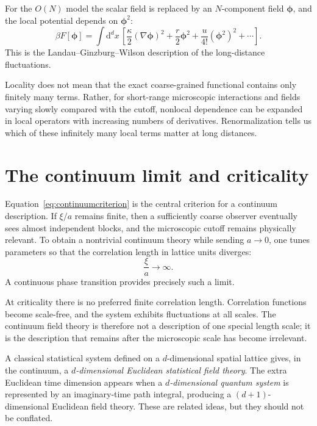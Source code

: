 \documentclass[11pt]{article}
\newcommand{\dd}{\mathrm{d}}
\begin{document}
For the $O(N)$ model the scalar field is replaced by an $N$-component field $\bm\phi$, and the local potential depends on $\bm\phi^2$:
\begin{equation}
  \beta F[\bm\phi]
  =\int \dd^d x\,
  \left[
  \frac{\kappa}{2}(\nabla\bm\phi)^2
  +\frac{r}{2}\bm\phi^2
  +\frac{u}{4!}(\bm\phi^2)^2
  +\cdots
  \right].
  \label{eq:ONLG}
\end{equation}
This is the Landau--Ginzburg--Wilson description of the long-distance fluctuations.

\begin{remarkbox}
Locality does not mean that the exact coarse-grained functional contains only finitely many terms.  Rather, for short-range microscopic interactions and fields varying slowly compared with the cutoff, nonlocal dependence can be expanded in local operators with increasing numbers of derivatives.  Renormalization tells us which of these infinitely many local terms matter at long distances.
\end{remarkbox}

\section{The continuum limit and criticality}

Equation~\eqref{eq:continuumcriterion} is the central criterion for a continuum description.  If $\xi/a$ remains finite, then a sufficiently coarse observer eventually sees almost independent blocks, and the microscopic cutoff remains physically relevant.  To obtain a nontrivial continuum theory while sending $a\to0$, one tunes parameters so that the correlation length in lattice units diverges:
\begin{equation}
  \frac{\xi}{a}\longrightarrow\infty.
\end{equation}
A continuous phase transition provides precisely such a limit.

At criticality there is no preferred finite correlation length.  Correlation functions become scale-free, and the system exhibits fluctuations at all scales.  The continuum field theory is therefore not a description of one special length scale; it is the description that remains after the microscopic scale has become irrelevant.

\begin{warningbox}[Dimensionality]
A classical statistical system defined on a $d$-dimensional spatial lattice gives, in the continuum, a \emph{$d$-dimensional Euclidean statistical field theory}.  The extra Euclidean time dimension appears when a \emph{$d$-dimensional quantum system} is represented by an imaginary-time path integral, producing a $(d+1)$-dimensional Euclidean field theory.  These are related ideas, but they should not be conflated.
\end{warningbox}
\end{document}
